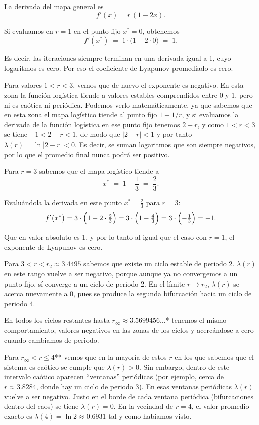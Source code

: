 \documentclass[
  10pt,
  a4paper,
  DIV=11,
  numbers=noendperiod,
  open=any]{scrreprt}
\numberwithin{equation}{chapter}
\numberwithin{equation}{section}
\renewcommand{\[}{\begin{equation}}
\renewcommand{\]}{\end{equation}}
\begin{document}
La derivada del mapa general es \[
   f'(x) = r\,(1 - 2x).
   \]

Si evaluamos en \(r = 1\) en el punto fijo \(x^* = 0\), obtenemos \[
   f'(x^*) \;=\; 1 \cdot \bigl(1 - 2 \cdot 0\bigr) \;=\; 1.
   \]

Es decir, las iteraciones siempre terminan en una derivada igual a 1,
cuyo logaritmos es cero. Por eso el coeficiente de Lyapunov promediado
es cero.

Para valores \textbf{\(1 < r < 3\)}, vemos que de nuevo el exponente es
negativo. En esta zona la función logística tiende a valores estables
comprendidos entre 0 y 1, pero ni es caótica ni periódica. Podemos verlo
matemáticamente, ya que sabemos que en esta zona el mapa logístico
tiende al punto fijo \(1-1/r\), y si evaluamos la derivada de la función
logística en ese punto fijo tenemos \(2 - r\), y como \(1<r<3\) se tiene
\(-1 < 2 - r < 1\), de modo que \(|2 - r|<1\) y por tanto
\(\lambda(r) = \ln|2 - r| < 0\). Es decir, se suman logaritmos que son
siempre negativos, por lo que el promedio final nunca podrá ser
positivo.

Para \(r = 3\) sabemos que el mapa logístico tiende a \[
   x^* \;=\; 1 - \frac{1}{3} \;=\; \frac{2}{3}.
   \]

Evaluándola la derivada en este punto \(x^* = \tfrac{2}{3}\) para
\(r = 3\): \[
   f'\bigl(x^*\bigr) 
   = 3 \cdot \Bigl(1 - 2 \cdot \tfrac{2}{3}\Bigr) 
   = 3 \cdot \Bigl(1 - \tfrac{4}{3}\Bigr) 
   = 3 \cdot \Bigl(-\tfrac{1}{3}\Bigr) 
   = -1.
   \]

Que en valor absoluto es 1, y por lo tanto al igual que el caso con
\(r=1\), el exponente de Lyapunov es cero.

Para \textbf{\(3 < r < r_2 \approx 3.4495\)} sabemos que existe un ciclo
estable de periodo 2. \(\lambda(r)\) en este rango vuelve a ser
negativo, porque aunque ya no convergemos a un punto fijo, sí converge a
un ciclo de periodo 2. En el límite \(r \to r_2\), \(\lambda(r)\) se
acerca nuevamente a 0, pues se produce la segunda bifurcación hacia un
ciclo de periodo 4.

En todos los ciclos restantes hasta \(r_\infty \approx 3.5699456\dots\)*
tenemos el mismo comportamiento, valores negativos en las zonas de los
ciclos y acercándose a cero cuando cambiamos de periodo.

Para \(r_\infty < r \le 4\)** vemos que en la mayoría de estos \(r\) en
los que sabemos que el sistema es caótico se cumple que
\(\lambda(r) > 0\). Sin embargo, dentro de este intervalo caótico
aparecen ``ventanas'' periódicas (por ejemplo, cerca de
\(r\approx 3.8284\), donde hay un ciclo de periodo 3). En esas ventanas
periódicas \(\lambda(r)\) vuelve a ser negativo. Justo en el borde de
cada ventana periódica (bifurcaciones dentro del caos) se tiene
\(\lambda(r)=0\). En la vecindad de \(r = 4\), el valor promedio exacto
es \(\lambda(4) = \ln 2 \approx 0.6931\) tal y como habíamos visto.
\end{document}
